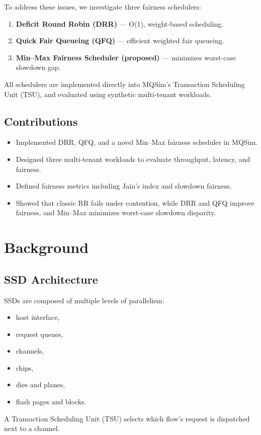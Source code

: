 \documentclass[11pt]{article}
\begin{document}
To address these issues, we investigate three fairness schedulers:
\begin{enumerate}
    \item \textbf{Deficit Round Robin (DRR)} — O(1), weight-based scheduling.
    \item \textbf{Quick Fair Queueing (QFQ)} — efficient weighted fair queueing.
    \item \textbf{Min--Max Fairness Scheduler (proposed)} — minimizes worst-case slowdown gap.
\end{enumerate}

All schedulers are implemented directly into MQSim’s Transaction Scheduling Unit (TSU),
and evaluated using synthetic multi-tenant workloads.

\subsection*{Contributions}
\begin{itemize}
    \item Implemented DRR, QFQ, and a novel Min--Max fairness scheduler in MQSim.
    \item Designed three multi-tenant workloads to evaluate throughput, latency, and fairness.
    \item Defined fairness metrics including Jain’s index and slowdown fairness.
    \item Showed that classic RR fails under contention, while DRR and QFQ improve fairness, and Min--Max minimizes worst-case slowdown disparity.
\end{itemize}

\section{Background}

\subsection{SSD Architecture}
SSDs are composed of multiple levels of parallelism:
\begin{itemize}
    \item host interface,
    \item request queues,
    \item channels,
    \item chips,
    \item dies and planes,
    \item flash pages and blocks.
\end{itemize}
A Transaction Scheduling Unit (TSU) selects which flow’s request is dispatched next to a channel.
\end{document}
